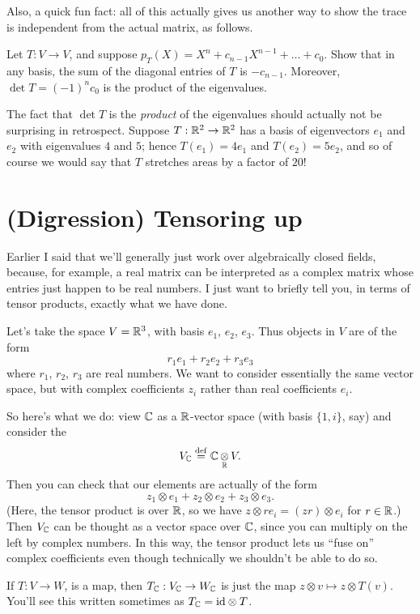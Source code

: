 Also, a quick fun fact: all of this actually gives us another way to show the trace
is independent from the actual matrix, as follows.
\begin{exercise}
	Let $T : V \to V$, and suppose $p_T(X) = X^n + c_{n-1}X^{n-1} + \dots + c_0$.
	Show that in any basis, the sum of the diagonal entries of $T$ is $-c_{n-1}$.
	Moreover, $\det T = (-1)^n c_0$ is the product of the eigenvalues.
\end{exercise}
The fact that $\det T$ is the \emph{product} of the eigenvalues should
actually not be surprising in retrospect.
Suppose $T : \mathbb R^2 \to \mathbb R^2$ has a basis of eigenvectors $e_1$ and $e_2$
with eigenvalues $4$ and $5$; hence $T(e_1) = 4e_1$ and $T(e_2) = 5e_2$,
and so of course we would say that $T$ stretches areas by a factor of $20$!

\section{(Digression) Tensoring up}
Earlier I said that we'll generally just work over algebraically closed fields,
because, for example, a real matrix can be interpreted as a complex matrix whose
entries just happen to be real numbers.
I just want to briefly tell you, in terms of tensor products, exactly what we have done.

Let's take the space $V = \mathbb R^3$, with basis $e_1$, $e_2$, $e_3$.
Thus objects in $V$ are of the form
\[ r_1 e_1 + r_2 e_2 + r_3 e_3 \]
where $r_1$, $r_2$, $r_3$ are real numbers.
We want to consider essentially the same vector space,
but with complex coefficients $z_i$ rather than real coefficients $e_i$.

So here's what we do: view $\mathbb C$ as a $\mathbb R$-vector space (with basis $\{1,i\}$, say)
and consider the 
\[ V_\mathbb C \overset{\mathrm{def}}{=} \mathbb C \mathop{\otimes}\limits_{\mathbb R} V. \]
Then you can check that our elements are actually of the form
\[ z_1 \otimes e_1 + z_2 \otimes e_2 + z_3 \otimes e_3. \]
(Here, the tensor product is over $\mathbb R$, so we have $z \otimes re_i = (zr) \otimes e_i$ for $r \in \mathbb R$.)
Then $V_{\mathbb C}$ can be thought as a vector space over $\mathbb C$, since you can multiply on the left
by complex numbers.
In this way, the tensor product lets us ``fuse on'' complex coefficients even though technically
we shouldn't be able to do so.

If $T : V \to W$, is a map, then $T_\mathbb C : V_\mathbb C \to W_\mathbb C$
is just the map $z \otimes v \mapsto z \otimes T(v)$.
You'll see this written sometimes as $T_\mathbb C = \mathrm{id} \otimes T$.


